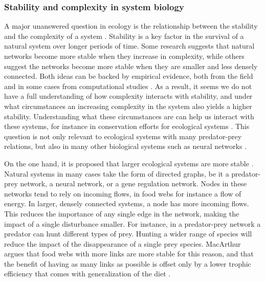 \documentclass[../main.tex]{subfiles}
\begin{document}
\subsubsection{Stability and complexity in system biology}

A major unanswered question in ecology is the relationship between the stability and the complexity of a system \cite{kondoh2003foraging, macarthur1955fluctuations, pimm1977number}.
Stability is a key factor in the survival of a natural system over longer periods of time.
Some research suggests that natural networks become more stable when they increase in complexity, while others suggest the networks become more stable when they are smaller and less densely connected.
Both ideas can be backed by empirical evidence, both from the field and in some cases from computational studies \cite{chen2001global, kondoh2003foraging}.
As a result, it seems we do not have a full understanding of how complexity interacts with stability, and under what circumstances an increasing complexity in the system also yields a higher stability.
Understanding what these circumstances are can help us interact with these systems, for instance in conservation efforts for ecological systems \cite{kondoh2003foraging}.
This question is not only relevant to ecological systems with many predator-prey relations, but also in many other biological systems such as neural networks \cite{tononi1999measures}.

On the one hand, it is proposed that larger ecological systems are more stable \cite{macarthur1955fluctuations}.
Natural systems in many cases take the form of directed graphs, be it a predator-prey network, a neural network, or a gene regulation network.
Nodes in these networks tend to rely on incoming flows, in food webs for instance a flow of energy.
In larger, densely connected systems, a node has more incoming flows.
This reduces the importance of any single edge in the network, making the impact of a single disturbance smaller.
For instance, in a predator-prey network a predator can hunt different types of prey.
Hunting a wider range of species will reduce the impact of the disappearance of a single prey species.
MacArthur argues that food webs with more links are more stable for this reason, and that the benefit of having as many links as possible is offset only by a lower trophic efficiency that comes with generalization of the diet \cite{macarthur1955fluctuations}.
\end{document}
